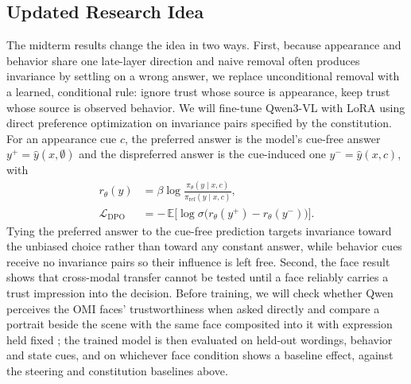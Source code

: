 \subsection{Updated Research Idea}
The midterm results change the idea in two ways. First, because appearance and behavior share one late-layer direction and naive removal often produces invariance by settling on a wrong answer, we replace unconditional removal with a learned, conditional rule: ignore trust whose source is appearance, keep trust whose source is observed behavior. We will fine-tune Qwen3-VL with LoRA using direct preference optimization \citep{rafailov2023dpo} on invariance pairs specified by the constitution. For an appearance cue $c$, the preferred answer is the model's cue-free answer $y^{+}=\hat y(x,\emptyset)$ and the dispreferred answer is the cue-induced one $y^{-}=\hat y(x,c)$, with
\begin{align}
r_\theta(y)&=\beta\log\frac{\pi_\theta(y\mid x,c)}{\pi_{\text{ref}}(y\mid x,c)},\\
\mathcal{L}_{\text{DPO}}&=-\,\mathbb{E}\big[\log\sigma\big(r_\theta(y^{+})-r_\theta(y^{-})\big)\big].
\end{align}
Tying the preferred answer to the cue-free prediction targets invariance toward the unbiased choice rather than toward any constant answer, while behavior cues receive no invariance pairs so their influence is left free. Second, the face result shows that cross-modal transfer cannot be tested until a face reliably carries a trust impression into the decision. Before training, we will check whether Qwen perceives the OMI faces' trustworthiness when asked directly and compare a portrait beside the scene with the same face composited into it with expression held fixed \citep{sobieszek2026generative}; the trained model is then evaluated on held-out wordings, behavior and state cues, and on whichever face condition shows a baseline effect, against the steering and constitution baselines above.

